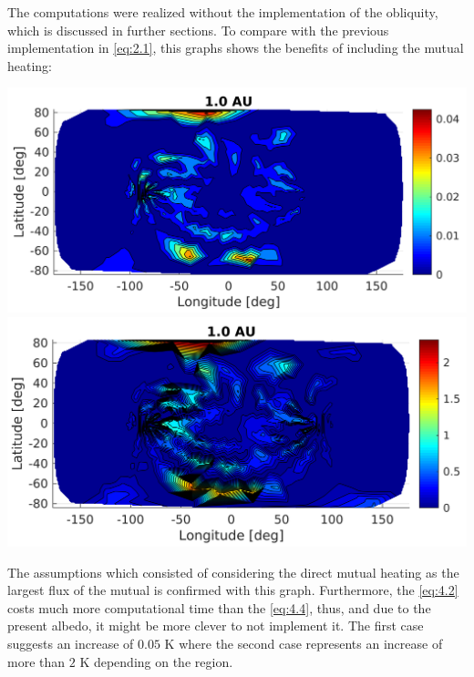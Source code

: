 The computations were realized without the implementation of the obliquity, which is discussed in further sections. To compare with the previous implementation in \autoref{eq:2.1}, this graphs shows the benefits of including the mutual heating:
\begin{center}
    \includegraphics[width=\linewidth]{rsc/mutual_W.png}
    \includegraphics[width=\linewidth]{rsc/mutual_Wu.png}
    \label{fig:4.4}
\end{center}
The assumptions which consisted of considering the direct mutual heating as the largest flux of the mutual is confirmed with this graph. Furthermore, the \autoref{eq:4.2} costs much more computational time than the \autoref{eq:4.4}, thus, and due to the present albedo, it might be more clever to not implement it. The first case suggests an increase of $0.05$ \si{\kelvin} where the second case represents an increase of more than $2$ \si{\kelvin} depending on the region.

